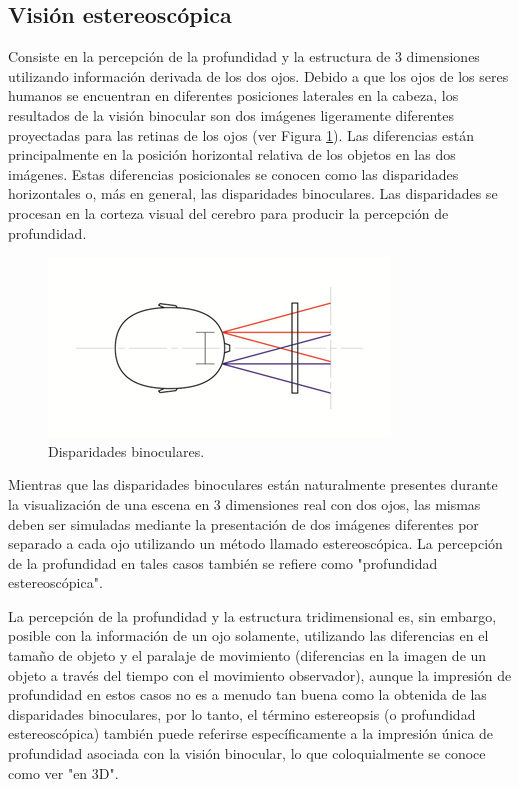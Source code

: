 \documentclass[12pt]{article}
\begin{document}
\subsection{Visión estereoscópica}
\noindent Consiste en la percepción de la profundidad y la estructura de 3 dimensiones utilizando información derivada de los dos ojos. Debido a que los ojos de los seres humanos se encuentran en diferentes posiciones laterales en la cabeza, los resultados de la visión binocular son dos imágenes ligeramente diferentes proyectadas para las retinas de los ojos (ver Figura \ref{disparidades}). Las diferencias están principalmente en la posición horizontal relativa de los objetos en las dos imágenes. Estas diferencias posicionales se conocen como las disparidades horizontales o, más en general, las disparidades binoculares. Las disparidades se procesan en la corteza visual del cerebro para producir la percepción de profundidad\cite{visionest}. 
\begin{figure}[h!]
\includegraphics[width =0.7\linewidth, center]{ojos.png}
\caption{Disparidades binoculares.}
\label{disparidades}
\end{figure}

Mientras que las disparidades binoculares están naturalmente presentes durante la visualización de una escena en 3 dimensiones real con dos ojos, las mismas deben ser simuladas mediante la presentación de dos imágenes diferentes por separado a cada ojo utilizando un método llamado estereoscópica. La percepción de la profundidad en tales casos también se refiere como "profundidad estereoscópica". 

La percepción de la profundidad y la estructura tridimensional  es, sin embargo, posible con la información de un ojo solamente, utilizando las diferencias en el tamaño de objeto y el paralaje de movimiento (diferencias en la imagen de un objeto a través del tiempo con el movimiento observador), aunque la impresión de profundidad en estos casos no es a menudo tan buena como la obtenida de las disparidades binoculares, por lo tanto, el término estereopsis (o profundidad estereoscópica) también puede referirse específicamente a la impresión única de profundidad asociada con la visión binocular, lo que coloquialmente se conoce como ver "en 3D".
\end{document}
